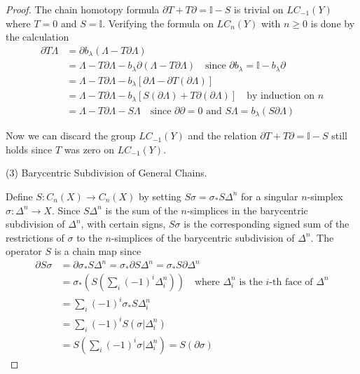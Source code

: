 \begin{proof}
The chain homotopy formula $\partial T + T\partial = \mathbb{I} - S$ is trivial on $LC_{-1}(Y)$ where $T = 0$ and $S = \mathbb{I}$. Verifying the formula on $LC_n(Y)$ with $n \geq 0$ is done by the calculation
\begin{align*}
\partial T\Lambda &= \partial b_\lambda(\Lambda - T\partial\Lambda)\\
&= \Lambda - T\partial\Lambda - b_\lambda\partial(\Lambda - T\partial\Lambda) \quad \text{since } \partial b_\lambda = \mathbb{I} - b_\lambda\partial\\
&= \Lambda - T\partial\Lambda - b_\lambda[\partial\Lambda - \partial T(\partial\Lambda)]\\
&= \Lambda - T\partial\Lambda - b_\lambda[S(\partial\Lambda) + T\partial(\partial\Lambda)] \quad \text{by induction on } n\\
&= \Lambda - T\partial\Lambda - S\Lambda \quad \text{since } \partial\partial = 0 \text{ and } S\Lambda = b_\lambda(S\partial\Lambda)
\end{align*}

Now we can discard the group $LC_{-1}(Y)$ and the relation $\partial T + T\partial = \mathbb{I} - S$ still holds since $T$ was zero on $LC_{-1}(Y)$.

\begin{description}
\item[(3) Barycentric Subdivision of General Chains.]
\end{description}

Define $S:C_n(X)\to C_n(X)$ by setting $S\sigma = \sigma_* S\Delta^n$ for a singular $n$-simplex $\sigma:\Delta^n\to X$. Since $S\Delta^n$ is the sum of the $n$-simplices in the barycentric subdivision of $\Delta^n$, with certain signs, $S\sigma$ is the corresponding signed sum of the restrictions of $\sigma$ to the $n$-simplices of the barycentric subdivision of $\Delta^n$. The operator $S$ is a chain map since
\begin{align*}
\partial S\sigma &= \partial\sigma_* S\Delta^n = \sigma_*\partial S\Delta^n = \sigma_*S\partial\Delta^n\\
&= \sigma_*\left(S\left(\sum_i(-1)^i\Delta^n_i\right)\right) \quad \text{where } \Delta^n_i \text{ is the } i\text{-th face of } \Delta^n\\
&= \sum_i(-1)^i\sigma_*S\Delta^n_i\\
&= \sum_i(-1)^iS(\sigma|\Delta^n_i)\\
&= S\left(\sum_i(-1)^i\sigma|\Delta^n_i\right) = S(\partial\sigma)
\end{align*}


\end{proof}
